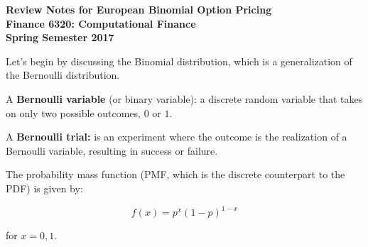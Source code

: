 \documentclass[11pt]{article}
\begin{document}
\textbf{Review Notes for European Binomial Option Pricing} \\
\textbf{Finance 6320: Computational Finance} \\
\textbf{Spring Semester 2017} \\
\vspace{5mm}

Let's begin by discussing the Binomial distribution, which is a generalization of the Bernoulli distribution. 

\vspace{2mm}
A \textbf{Bernoulli variable} (or binary variable): a discrete random variable that takes on only two possible outcomes,
$0$ or $1$. 

\vspace{2mm}
A \textbf{Bernoulli trial:} is an experiment where the outcome is the realization of a Bernoulli variable, resulting in
success or failure.

\vspace{2mm}
The probability mass function (PMF, which is the discrete counterpart to the PDF) is given by:

\begin{equation*}
	f(x) = p^{x} (1 - p)^{1-x}
\end{equation*}

for $x = 0, 1$.
\end{document}
